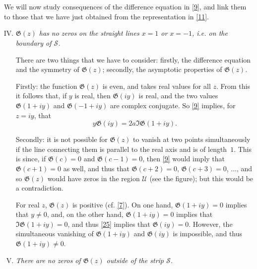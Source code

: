 \documentclass{article}
\newcommand{\GG}{\mathfrak{G}}
\newcommand{\UU}{\mathscr{U}}
\renewcommand{\SS}{\mathscr{S}}
\newcommand{\oldpage}[1]{\marginpar{\phantom{.}\\\footnotesize$\Big\vert$ \textit{p.~#1}}}
\begin{document}
\section{}
\label{section3}

We will now study consequences of the difference equation in \cref{9}, and link them to those that we have just obtained from the representation in \cref{11}.

\begin{enumerate}[I.]
\setcounter{enumi}{3}
  \item \emph{$\GG(z)$ has no zeros on the straight lines $x=1$ or $x=-1$, i.e. on the boundary of $\SS$.}
    \label{IV}

\oldpage{312}
    There are two things that we have to consider:
    firstly, the difference equation and the symmetry of $\GG(z)$; secondly, the asymptotic properties of $\GG(z)$.

    Firstly:
    the function $\GG(z)$ is even, and takes real values for all $z$.
    From this it follows that, if $y$ is real, then $\GG(iy)$ is real, and the two values $\GG(1+iy)$ and $\GG(-1+iy)$ are complex conjugate.
    So \cref{9} implies, for $z=iy$, that
    \[
    \label{25}
      y\GG(iy) = 2a\Im\GG(1+iy).
    \tag{25}
    \]

    Secondly:
    it is not possible for $\GG(z)$ to vanish at two points simultaneously if the line connecting them is parallel to the real axis and is of length~$1$.
    This is since, if $\GG(c)=0$ and $\GG(c-1)=0$, then \cref{9} would imply that $\GG(c+1)=0$ as well, and thus that $\GG(c+2)=0$, $\GG(c+3)=0$, ..., and so $\GG(z)$ would have zeros in the region $\UU$ (see the figure); but this would be a contradiction.

    For real $z$, $\GG(z)$ is positive (cf. \cref{7}).
    On one hand, $\GG(1+iy)=0$ implies that $y\neq0$, and, on the other hand, $\GG(1+iy)=0$ implies that $\Im\GG(1+iy)=0$, and thus \cref{25} implies that $\GG(iy)=0$.
    However, the simultaneous vanishing of $\GG(1+iy)$ and $\GG(iy)$ is impossible, and thus $\GG(1+iy)\neq0$.
  \item \emph{There are no zeros of $\GG(z)$ outside of the strip $\SS$.}
    \label{V}


\end{enumerate}
\end{document}
